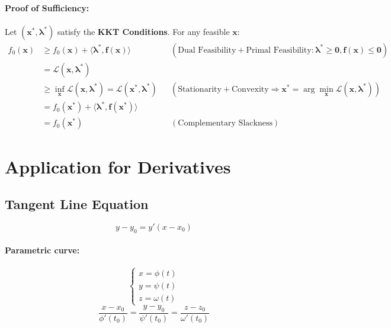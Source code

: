 \documentclass{article}
\begin{document}
\paragraph{Proof of Sufficiency:}
Let $(\mathbf{x}^*, \boldsymbol{\lambda}^*)$ satisfy the \textbf{KKT Conditions}. For any feasible $\mathbf{x}$:
\begin{align*}
    f_0(\mathbf{x})
    &\ge f_0(\mathbf{x}) + \langle \boldsymbol{\lambda}^*, \mathbf{f}(\mathbf{x}) \rangle
        & & (\text{Dual Feasibility} + \text{Primal Feasibility}: \boldsymbol{\lambda}^* \ge \mathbf{0}, \mathbf{f}(\mathbf{x}) \le \mathbf{0}) \\
    &= \mathcal{L}(\mathbf{x}, \boldsymbol{\lambda}^*) \\
    &\ge \inf_{\mathbf{x}} \mathcal{L}(\mathbf{x}, \boldsymbol{\lambda}^*)
        = \mathcal{L}(\mathbf{x}^*, \boldsymbol{\lambda}^*)
        & & (\text{Stationarity} + \text{Convexity} \Rightarrow \mathbf{x}^* = \arg\min_{\mathbf{x}} \mathcal{L}(\mathbf{x}, \boldsymbol{\lambda}^*)) \\
    &= f_0(\mathbf{x}^*) + \langle \boldsymbol{\lambda}^*, \mathbf{f}(\mathbf{x}^*) \rangle \\
    &= f_0(\mathbf{x}^*)
        & & (\text{Complementary Slackness})
\end{align*}

\newpage
\section{Application for Derivatives}

\subsection{Tangent Line Equation}

\[
    y - y_0 = y'(x - x_0)
\]

\paragraph{Parametric curve:}
\[
    \begin{cases}
        x = \phi(t) \\
        y = \psi(t) \\
        z = \omega(t)
    \end{cases}
\]
\[
    \frac{x - x_0}{\phi'(t_0)} = \frac{y - y_0}{\psi'(t_0)} = \frac{z - z_0}{\omega'(t_0)}
\]
\end{document}
